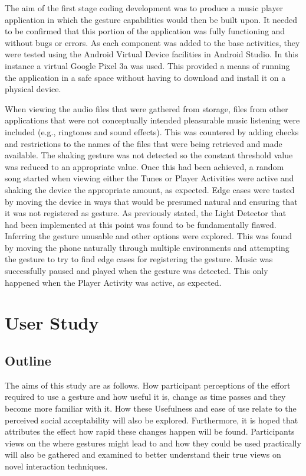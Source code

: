 \documentclass{l4proj}
\begin{document}
The aim of the first stage coding development was to produce a music player application in which the gesture capabilities would then be built upon. It needed to be confirmed that this portion of the application was fully functioning and without bugs or errors. As each component was added to the base activities, they were tested using the Android Virtual Device facilities in Android Studio. In this instance a virtual Google Pixel 3a was used. This provided a means of running the application in a safe space without having to download and install it on a physical device. 


When viewing the audio files that were gathered from storage, files from other applications that were not conceptually intended pleasurable music listening were included (e.g., ringtones and sound effects). This was countered by adding checks and restrictions to the names of the files that were being retrieved and made available. The shaking gesture was not detected so the constant threshold value was reduced to an appropriate value. Once this had been achieved, a random song started when viewing either the Tunes or Player Activities were active and shaking the device the appropriate amount, as expected. Edge cases were tasted by moving the device in ways that would be presumed natural and ensuring that it was not registered as gesture. As previously stated, the Light Detector that had been implemented at this point was found to be fundamentally flawed. Inferring the gesture unusable and other options were explored. This was found by moving the phone naturally through multiple environments and attempting the gesture to try to find edge cases for registering the gesture. Music was successfully paused and played when the gesture was detected. This only happened when the Player Activity was active, as expected.


\chapter{User Study}

\section{Outline}
The aims of this study are as follows. How participant perceptions of the effort required to use a gesture and how useful it is, change as time passes and they become more familiar with it. How these Usefulness and ease of use relate to the perceived social acceptability will also be explored. Furthermore, it is hoped that attributes the effect how rapid these changes happen will be found. Participants views on the where gestures might lead to and how they could be used practically will also be gathered and examined to better understand their true views on novel interaction techniques.
\end{document}
